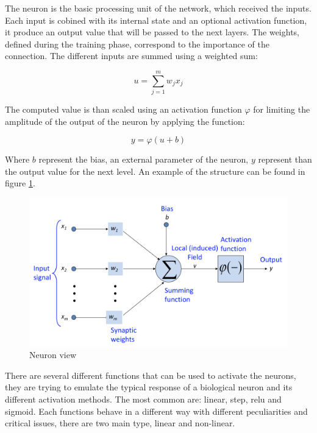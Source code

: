 \documentclass[%
    corpo=12pt,
    twoside,
    oldstyle,
    autoretitolo,
    greek,
    evenboxes,
]{toptesi}
\begin{document}
The neuron is the basic processing unit of the network, which received the inputs. Each input is cobined with its internal state and an optional activation function, it  produce an output value that will be passed to the next layers. The weights, defined during the training phase, correspond to the importance of the connection. The different inputs are summed using a weighted sum:
\begin{center}
  \begin{equation}
    u = \sum^{m}_{j=1} w_{j}x_{j}
  \end{equation}
\end{center}
The computed value is than scaled using an activation function $\varphi$ for limiting the amplitude of the output of the neuron by applying the function:
\begin{center}
  \begin{equation}
    y = \varphi(u + b)
  \end{equation}
\end{center}
Where $b$ represent the bias, an external parameter of the neuron, $y$ represent than the output value for the next level. An example of the structure can be found in figure \ref{fig:neuron}.

\begin{figure}[!ht]
  \includegraphics[width=\linewidth]{figure/neuron.png}
  \caption{Neuron view}
  \label{fig:neuron}
\end{figure}

There are several different functions that can be used to activate the neurons, they are trying to emulate the typical response of a biological neuron and its different activation methods. The most common are: linear, step, relu and sigmoid.
Each functions behave in a different way with different peculiarities and critical issues, there are two main type, linear and non-linear.
\end{document}
